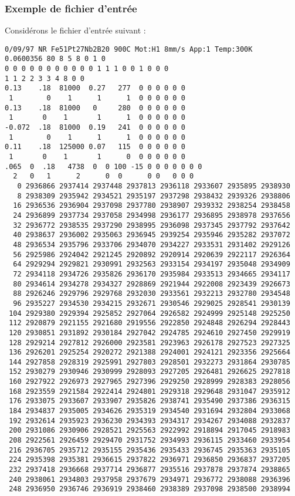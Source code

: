 \subsubsection{Exemple de fichier d'entrée}
Considérons le fichier d'entrée suivant :
\begin{lstlisting}[frame=tbl]
0/09/97 NR Fe51Pt27Nb2B20 900C Mot:H1 8mm/s App:1 Temp:300K
0.0600356 80 8 5 8 0 1 0
0 0 0 0 0 0 0 0 0 0 0 1 1 1 0 0 1 0 0 0
1 1 2 2 3 3 4 8 0 0
0.13    .18  81000  0.27   277  0 0 0 0 0 0 
 1        0    1      1      1  0 0 0 0 0 0
0.13    .18  81000   0     280  0 0 0 0 0 0 
 1       0    1       1      1  0 0 0 0 0 0
-0.072  .18  81000  0.19   241  0 0 0 0 0 0 
 1        0    1      1      1  0 0 0 0 0 0
0.11    .18  125000 0.07   115  0 0 0 0 0 0 
 1       0    1       1      0  0 0 0 0 0 0
.065  0  .18   4738  0  0 100 -15 0 0 0 0 0 0 0
  2   0   1      2      0  0      0 0   0 0 0
   0 2936866 2937414 2937448 2937813 2936118 2933607 2935895 2938930
   8 2938309 2935942 2934521 2935197 2937298 2938432 2939326 2938806
  16 2936536 2936904 2937098 2937780 2938907 2939332 2938254 2938458
  24 2936899 2937734 2937058 2934998 2936177 2936895 2938978 2937656
  32 2936772 2938535 2937290 2938995 2936098 2937345 2937792 2937642
  40 2938637 2936002 2935063 2936945 2939254 2935946 2935282 2937072
  48 2936534 2935796 2933706 2934070 2934227 2933531 2931402 2929126
  56 2925986 2924042 2921245 2920892 2920914 2920639 2922117 2926364
  64 2929294 2929821 2930991 2932563 2933154 2934197 2935048 2934909
  72 2934118 2934726 2935826 2936170 2935984 2933513 2934665 2934117
  80 2934614 2934278 2934327 2928869 2921944 2922008 2923439 2926673
  88 2926246 2929796 2929768 2932030 2933561 2932213 2932780 2934548
  96 2935227 2934530 2934215 2932671 2930546 2929025 2928541 2930139
 104 2929380 2929394 2925852 2927064 2926582 2924999 2925148 2925250
 112 2920879 2921155 2921680 2919556 2922850 2924848 2926294 2928443
 120 2930851 2931892 2930184 2927042 2924785 2924610 2927450 2929919
 128 2929214 2927812 2926000 2923581 2923963 2926178 2927523 2927325
 136 2926201 2925254 2920272 2921388 2924001 2924121 2923356 2925664
 144 2927858 2928319 2925991 2927803 2928501 2932273 2931864 2930785
 152 2930279 2930946 2930999 2928093 2927205 2926481 2926625 2927818
 160 2927922 2926973 2927965 2927396 2929250 2928999 2928383 2928056
 168 2923559 2921584 2922414 2924801 2929318 2929648 2931047 2935912
 176 2933075 2933607 2933907 2935826 2938741 2935490 2937386 2936315
 184 2934837 2935005 2934626 2935319 2934540 2931694 2932804 2933068
 192 2932614 2935923 2936230 2934393 2934317 2934267 2934088 2932837
 200 2931086 2930906 2928521 2925563 2922992 2918894 2917045 2918983
 208 2922561 2926459 2929470 2931752 2934993 2936115 2933460 2933954
 216 2936705 2935712 2935155 2935436 2935433 2936745 2935363 2935105
 224 2935398 2935381 2936615 2937822 2936971 2936850 2936837 2937205
 232 2937418 2936668 2937714 2936877 2935516 2937878 2937874 2938865
 240 2938061 2934803 2937958 2937679 2934971 2936772 2938088 2936396
 248 2936950 2936746 2936919 2938460 2938389 2937098 2938500 2938994
\end{lstlisting}
